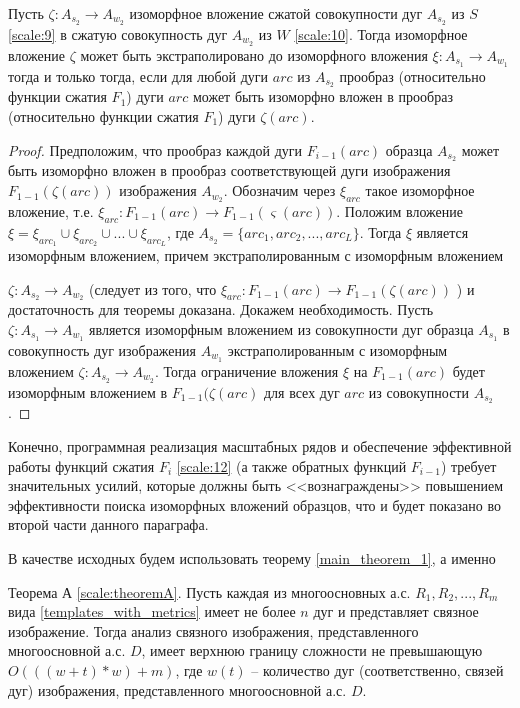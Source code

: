 \begin{theorem}
Пусть  $\zeta: A_{s_2} \to A_{w_2}$  изоморфное вложение сжатой совокупности дуг $A_{s_2}$ из $S$ \ref{scale:9} в  сжатую  совокупность дуг $A_{w_2}$ из  $W$ \ref{scale:10}. Тогда  изоморфное вложение  $\zeta$  может быть экстраполировано  до  изоморфного вложения  $\xi: A_{s_1} \to A_{w_1}$ тогда и только тогда, если   для любой дуги $arc$ из $A_{s_2}$ прообраз  (относительно  функции сжатия  $F_1$)  дуги  $arc$ может быть изоморфно вложен в прообраз  (относительно  функции сжатия  $F_1$)   дуги $\zeta(arc)$.                 
\label{scale:theoremA}
\end{theorem}            
\begin{proof}
Предположим, что  прообраз каждой дуги $F_{i-1}(arc)$ образца $A_{s_2}$  может быть изоморфно вложен в прообраз соответствующей дуги изображения  $F_{1-1}(\zeta (arc))$  изображения  $A_{w_2}$.  Обозначим через  $\xi_{arc}$ такое изоморфное вложение, т.е.  $\xi_{arc} : F_{1 -1}(arc) \to F_{1 -1}(\varsigma (arc))$.  
Положим вложение $\xi = \xi_{arc_1} \cup \xi_{arc_2} \cup ... \cup \xi_{arc_L}$, где $A_{s_2} = \{arc_1, arc_2, ..., arc_L\}$. Тогда $\xi$ является изоморфным вложением, причем  экстраполированным  с изоморфным вложением  

$\zeta : A_{s_2} \to A_{w_2}$ (следует из того, что $\xi_{arc} : F_{1 -1}(arc) \to F_{1 -1}(\zeta (arc))$ ) и достаточность для теоремы  доказана.    
Докажем необходимость. Пусть $\zeta : A_{s_1} \to A_{w_1}$ является изоморфным вложением из совокупности дуг образца  $A_{s_1}$  в совокупность дуг  изображения  $A_{w_1}$ экстраполированным  с изоморфным вложением  $\zeta : A_{s_2} \to A_{w_2}$.  Тогда ограничение вложения  $\xi$  на  $F_{1 -1}(arc)$  будет изоморфным вложением в $F_{1 -1}(\zeta (arc)$  для всех дуг  $arc$  из  совокупности  $A_{s_2}$. 
\end{proof}          

\begin{remark}
Конечно, программная реализация масштабных рядов и обеспечение эффективной работы функций сжатия $F_i$ \ref{scale:12}  (а также обратных функций $F_{i -1}$)  требует  значительных усилий, которые должны быть <<вознаграждены>> повышением эффективности поиска изоморфных вложений образцов, что и будет показано во второй части данного параграфа.
\end{remark}

В качестве исходных будем использовать теорему \ref{main_theorem_1}, а именно  
\begin{theorem}
Теорема А \ref{scale:theoremA}.  Пусть каждая из многоосновных а.с. $R_1, R_2,..., R_m$  вида \ref{templates_with_metrics}  имеет не  более   $n$ дуг и представляет связное изображение. Тогда анализ  связного изображения, представленного  многоосновной а.с.  $D$,  имеет верхнюю границу сложности не превышающую $O(((w + t)*w) + m)$,  где  $w (t)$ – количество дуг (соответственно, связей дуг) изображения, представленного  многоосновной а.с. $D$.  
\end{theorem}

